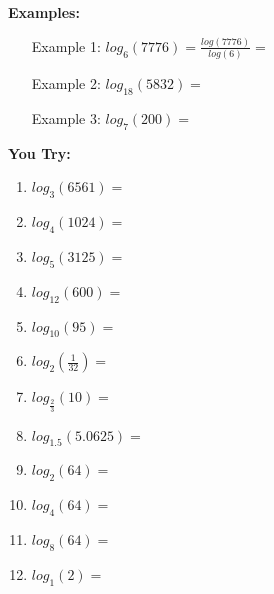 \documentclass[12pt]{article}
\begin{document}
\textbf{Examples:}
\begin{enumerate}

\item[Example 1:] $log_6(7776)=\frac{log(7776)}{log(6)}=$\\

\item[Example 2:] $log_{18}(5832)=$\\

\item[Example 3:] $log_{7}(200)=$\\

\end{enumerate}

\hrulefill

\textbf{You Try:}\\

\begin{multicols}{2}
\begin{enumerate}
	\setlength\itemsep{1.5cm}

	\item $log_{3}(6561)=$\\
	
	\item $log_{4}(1024)=$\\
	
	\item $log_{5}(3125)=$\\
	
	\item $log_{12}(600)=$\\
	
	\item $log_{10}(95)=$\\
	
	\item $log_{2}(\frac{1}{32})=$\\

	\item $log_{\frac{2}{3}}(10)=$\\
	
	\item $log_{1.5}(5.0625)=$\\
	
	\item $log_{2}(64)=$\\
	
	\item $log_{4}(64)=$\\
	
	\item $log_{8}(64)=$\\
	
	\item $log_{1}(2)=$	
	

\end{enumerate}
\end{multicols}
\end{document}
